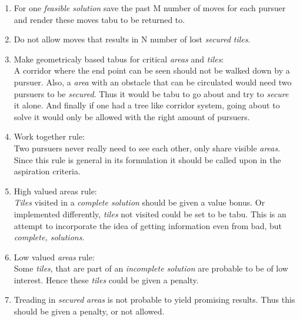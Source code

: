 \begin{enumerate}
\item{}For one \emph{feasible solution} save the past M number of moves for each pursuer and render these moves tabu to be returned to.
\item{}Do not allow moves that results in N number of lost \emph{secured} \emph{tiles}.
\item{}Make geometricaly based tabus for critical \emph{areas} and \emph{tiles}:\vspace{0,1cm}\\
A corridor where the end point can be seen should not be walked down by a pursuer. Also, a \emph{area} with an obstacle that can be circulated would need two pursuers to be \emph{secured}. Thus it would be tabu to go about and try to \emph{secure} it alone. And finally if one had a tree like corridor system, going about to solve it would only be allowed with the right amount of pursuers.
\item{} Work together rule: \vspace{0,1cm}\\
Two pursuers never really need to see each other, only share visible \emph{areas}. Since this rule is general in its formulation it should be called upon in the aspiration criteria.
\item{} High valued areas rule: \vspace{0,1cm}\\
\emph{Tiles} visited in a \emph{complete solution} should be given a value bonus. Or implemented differently, \emph{tiles} not visited could be set to be tabu. This is an attempt to incorporate the idea of getting information even from bad, but \emph{complete, solutions}.
\item{} Low valued \emph{areas} rule: \vspace{0,1cm}\\
Some \emph{tiles}, that are part of an \emph{incomplete solution} are probable to be of low interest. Hence these \emph{tiles} could be given a penalty.
\item{} Treading in \emph{secured} \emph{areas} is not probable to yield promising results. Thus this should be given a penalty, or not allowed.
\end{enumerate}

